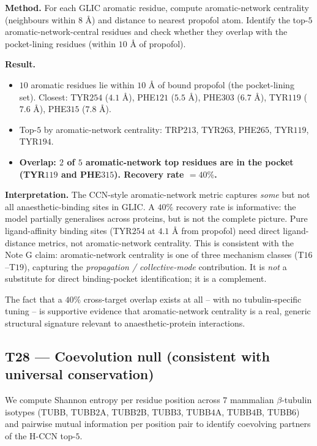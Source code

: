 \documentclass[11pt,a4paper]{article}
\begin{document}
\textbf{Method.} For each GLIC aromatic residue, compute aromatic-network
centrality (neighbours within $8$ \AA) and distance to nearest propofol
atom. Identify the top-$5$ aromatic-network-central residues and check
whether they overlap with the pocket-lining residues (within $10$ \AA{}
of propofol).

\textbf{Result.}
\begin{itemize}\itemsep0pt
  \item $10$ aromatic residues lie within $10$ \AA{} of bound propofol
    (the pocket-lining set). Closest: TYR$254$ ($4.1$ \AA),
    PHE$121$ ($5.5$ \AA), PHE$303$ ($6.7$ \AA), TYR$119$ ($7.6$ \AA),
    PHE$315$ ($7.8$ \AA).
  \item Top-$5$ by aromatic-network centrality: TRP$213$, TYR$263$,
    PHE$265$, TYR$119$, TYR$194$.
  \item \textbf{Overlap: $2$ of $5$ aromatic-network top residues are in
    the pocket (TYR$119$ and PHE$315$). Recovery rate $= 40\%$.}
\end{itemize}

\textbf{Interpretation.} The CCN-style aromatic-network metric captures
\emph{some} but not all anaesthetic-binding sites in GLIC. A $40\%$
recovery rate is informative: the model partially generalises across
proteins, but is not the complete picture. Pure ligand-affinity binding
sites (TYR$254$ at $4.1$ \AA{} from propofol) need direct ligand-distance
metrics, not aromatic-network centrality. This is consistent with the
Note G claim: aromatic-network centrality is one of three mechanism
classes (T$16$--T$19$), capturing the \emph{propagation / collective-mode}
contribution. It is \emph{not} a substitute for direct binding-pocket
identification; it is a complement.

The fact that a $40\%$ cross-target overlap exists at all -- with no
tubulin-specific tuning -- is supportive evidence that aromatic-network
centrality is a real, generic structural signature relevant to
anaesthetic-protein interactions.

\subsection{\textsf{T28} --- Coevolution null (consistent with universal conservation)}\label{ssec:t28}

We compute Shannon entropy per residue position across $7$ mammalian
$\beta$-tubulin isotypes (TUBB, TUBB$2$A, TUBB$2$B, TUBB$3$, TUBB$4$A,
TUBB$4$B, TUBB$6$) and pairwise mutual information per position pair
to identify coevolving partners of the H-CCN top-$5$.
\end{document}
